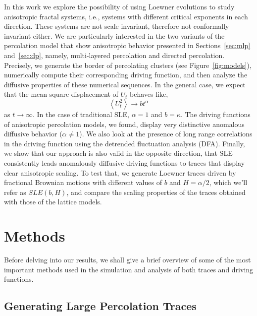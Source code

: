 In this work we explore the possibility of using Loewner evolutions to study
anisotropic fractal systems, i.e., systems with different critical exponents in
each direction. These systems are not scale invariant, therefore not
conformally invariant either. We are particularly interested in the two
variants of the percolation model that show anisotropic behavior presented in
Sections~\ref{sec:mlp} and~\ref{sec:dp}, namely, multi-layered percolation and
directed percolation. Precisely, we generate the border of percolating
clusters (see Figure~\ref{fig:models}), numerically compute their corresponding
driving function, and then analyze the diffusive properties of these numerical
sequences. In the general case, we expect that the mean square displacement of
$U_t$ behaves like,
\begin{equation}
    \label{eq:diff}
    \left\langle U_t^2 \right\rangle \rightarrow b t^\alpha
\end{equation} 
as $t\rightarrow\infty$. In the case of traditional SLE, $\alpha=1$ and
$b=\kappa$.  The driving functions of anisotropic percolation models, we found,
display very distinctive anomalous diffusive behavior ($\alpha\neq1$). We also
look at the presence of long range correlations in the driving function using
the detrended fluctuation analysis (DFA). Finally, we show that our approach is
also valid in the opposite direction, that SLE consistently leads
anomalously diffusive driving functions to traces that display clear
anisotropic scaling. To test that, we generate Loewner traces driven by
fractional Brownian motions with different values of $b$ and $H=\alpha/2$,
which we'll refer as $SLE(b,H)$, and compare the scaling properties of the
traces obtained with those of the lattice models.

\section{Methods}
\label{sec:methods}

Before delving into our results, we shall give a brief overview of some of the
most important methods used in the simulation and analysis of both traces
and driving functions.

\subsection{Generating Large Percolation Traces}
\label{sec:hulls}

